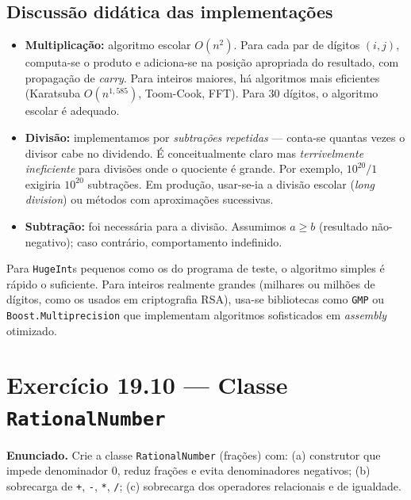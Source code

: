 \documentclass[11pt,a4paper]{article}
\begin{document}
\subsection*{Discuss\~ao did\'atica das implementa\c{c}\~oes}

\begin{itemize}[leftmargin=*]
  \item \textbf{Multiplica\c{c}\~ao:} algoritmo escolar $O(n^2)$. Para cada par de d\'igitos $(i, j)$, computa-se o produto e adiciona-se na posi\c{c}\~ao apropriada do resultado, com propaga\c{c}\~ao de \emph{carry}. Para inteiros maiores, h\'a algoritmos mais eficientes (Karatsuba $O(n^{1{,}585})$, Toom-Cook, FFT). Para 30 d\'igitos, o algoritmo escolar \'e adequado.
  \item \textbf{Divis\~ao:} implementamos por \emph{subtra\c{c}\~oes repetidas} --- conta-se quantas vezes o divisor cabe no dividendo. \'E concei\-tualmente claro mas \emph{terrivelmente ineficiente} para divis\~oes onde o quociente \'e grande. Por exemplo, $10^{20} / 1$ exigiria $10^{20}$ subtra\c{c}\~oes. Em produ\c{c}\~ao, usar-se-ia a divis\~ao escolar (\emph{long division}) ou m\'etodos com aproxima\c{c}\~oes sucessivas.
  \item \textbf{Subtra\c{c}\~ao:} foi necess\'aria para a divis\~ao. Assumimos $a \geq b$ (resultado n\~ao-negativo); caso contr\'ario, comportamento indefinido.
\end{itemize}

\begin{dicadesemp}
Para \texttt{HugeInt}s pequenos como os do programa de teste, o algoritmo simples \'e r\'apido o suficiente. Para inteiros realmente grandes (milhares ou milh\~oes de d\'igitos, como os usados em criptografia RSA), usa-se bibliotecas como \texttt{GMP} ou \texttt{Boost.Multiprecision} que implementam algoritmos sofisticados em \emph{assembly} otimizado.
\end{dicadesemp}

\newpage
\section{Exerc\'icio 19.10 --- Classe \texttt{RationalNumber}}

\begin{enunciado}
\textbf{Enunciado.} Crie a classe \texttt{RationalNumber} (fra\c{c}\~oes) com: (a) construtor que impede denominador 0, reduz fra\c{c}\~oes e evita denominadores negativos; (b) sobrecarga de \texttt{+}, \texttt{-}, \texttt{*}, \texttt{/}; (c) sobrecarga dos operadores relacionais e de igualdade.
\end{enunciado}
\end{document}
